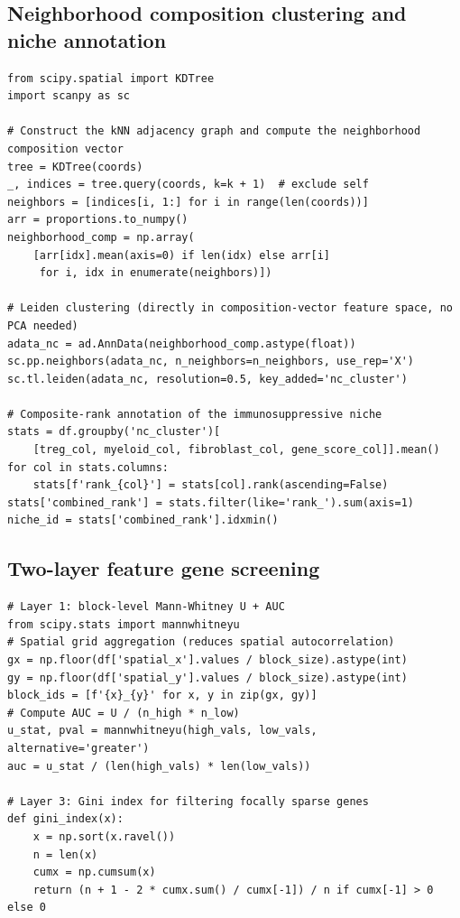 \documentclass[12pt, a4paper]{article}
\begin{document}
\subsection{Neighborhood composition clustering and niche annotation}

\begin{lstlisting}[caption={Neighborhood composition vector computation, Leiden clustering, and composite-rank annotation}]
from scipy.spatial import KDTree
import scanpy as sc

# Construct the kNN adjacency graph and compute the neighborhood composition vector
tree = KDTree(coords)
_, indices = tree.query(coords, k=k + 1)  # exclude self
neighbors = [indices[i, 1:] for i in range(len(coords))]
arr = proportions.to_numpy()
neighborhood_comp = np.array(
    [arr[idx].mean(axis=0) if len(idx) else arr[i]
     for i, idx in enumerate(neighbors)])

# Leiden clustering (directly in composition-vector feature space, no PCA needed)
adata_nc = ad.AnnData(neighborhood_comp.astype(float))
sc.pp.neighbors(adata_nc, n_neighbors=n_neighbors, use_rep='X')
sc.tl.leiden(adata_nc, resolution=0.5, key_added='nc_cluster')

# Composite-rank annotation of the immunosuppressive niche
stats = df.groupby('nc_cluster')[
    [treg_col, myeloid_col, fibroblast_col, gene_score_col]].mean()
for col in stats.columns:
    stats[f'rank_{col}'] = stats[col].rank(ascending=False)
stats['combined_rank'] = stats.filter(like='rank_').sum(axis=1)
niche_id = stats['combined_rank'].idxmin()
\end{lstlisting}

\subsection{Two-layer feature gene screening}

\begin{lstlisting}[caption={Layer 1 differential testing and Layer 3 Gini index computation}]
# Layer 1: block-level Mann-Whitney U + AUC
from scipy.stats import mannwhitneyu
# Spatial grid aggregation (reduces spatial autocorrelation)
gx = np.floor(df['spatial_x'].values / block_size).astype(int)
gy = np.floor(df['spatial_y'].values / block_size).astype(int)
block_ids = [f'{x}_{y}' for x, y in zip(gx, gy)]
# Compute AUC = U / (n_high * n_low)
u_stat, pval = mannwhitneyu(high_vals, low_vals, alternative='greater')
auc = u_stat / (len(high_vals) * len(low_vals))

# Layer 3: Gini index for filtering focally sparse genes
def gini_index(x):
    x = np.sort(x.ravel())
    n = len(x)
    cumx = np.cumsum(x)
    return (n + 1 - 2 * cumx.sum() / cumx[-1]) / n if cumx[-1] > 0 else 0
\end{lstlisting}
\end{document}
